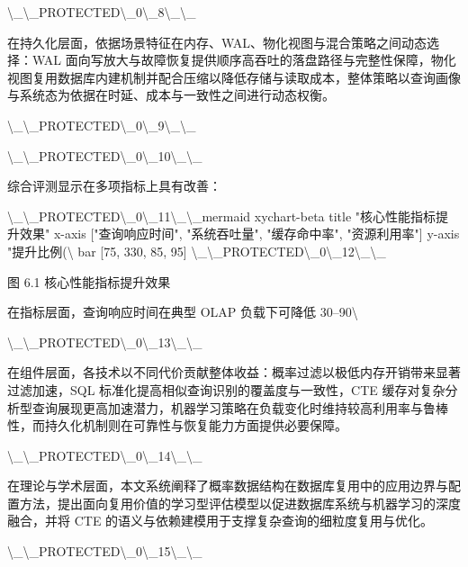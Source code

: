 \textbackslash{}_\textbackslash{}_PROTECTED\textbackslash{}_0\textbackslash{}_8\textbackslash{}_\textbackslash{}_

在持久化层面，依据场景特征在内存、WAL、物化视图与混合策略之间动态选择：WAL 面向写放大与故障恢复提供顺序高吞吐的落盘路径与完整性保障，物化视图复用数据库内建机制并配合压缩以降低存储与读取成本，整体策略以查询画像与系统态为依据在时延、成本与一致性之间进行动态权衡。

\textbackslash{}_\textbackslash{}_PROTECTED\textbackslash{}_0\textbackslash{}_9\textbackslash{}_\textbackslash{}_

\textbackslash{}_\textbackslash{}_PROTECTED\textbackslash{}_0\textbackslash{}_10\textbackslash{}_\textbackslash{}_

综合评测显示在多项指标上具有改善：

\textbackslash{}_\textbackslash{}_PROTECTED\textbackslash{}_0\textbackslash{}_11\textbackslash{}_\textbackslash{}_mermaid
xychart-beta
    title "核心性能指标提升效果"
    x-axis ["查询响应时间", "系统吞吐量", "缓存命中率", "资源利用率"]
    y-axis "提升比例(\textbackslash{}%
    bar [75, 330, 85, 95]
\textbackslash{}_\textbackslash{}_PROTECTED\textbackslash{}_0\textbackslash{}_12\textbackslash{}_\textbackslash{}_

图 6.1 核心性能指标提升效果

在指标层面，查询响应时间在典型 OLAP 负载下可降低 30–90\textbackslash{}%

\textbackslash{}_\textbackslash{}_PROTECTED\textbackslash{}_0\textbackslash{}_13\textbackslash{}_\textbackslash{}_

在组件层面，各技术以不同代价贡献整体收益：概率过滤以极低内存开销带来显著过滤加速，SQL 标准化提高相似查询识别的覆盖度与一致性，CTE 缓存对复杂分析型查询展现更高加速潜力，机器学习策略在负载变化时维持较高利用率与鲁棒性，而持久化机制则在可靠性与恢复能力方面提供必要保障。

\textbackslash{}_\textbackslash{}_PROTECTED\textbackslash{}_0\textbackslash{}_14\textbackslash{}_\textbackslash{}_

在理论与学术层面，本文系统阐释了概率数据结构在数据库复用中的应用边界与配置方法，提出面向复用价值的学习型评估模型以促进数据库系统与机器学习的深度融合，并将 CTE 的语义与依赖建模用于支撑复杂查询的细粒度复用与优化。

\textbackslash{}_\textbackslash{}_PROTECTED\textbackslash{}_0\textbackslash{}_15\textbackslash{}_\textbackslash{}_

